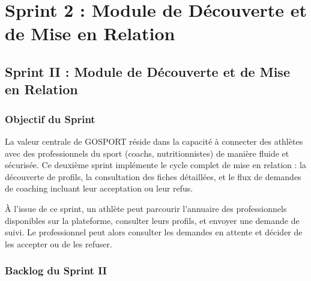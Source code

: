 \chapter{Sprint 2 : Module de Découverte et de Mise en Relation}
\minitoc
\newpage

\section{Sprint II : Module de Découverte et de Mise en Relation}

\subsection{Objectif du Sprint}
La valeur centrale de GOSPORT réside dans la capacité à connecter des athlètes avec des professionnels du sport (coachs, nutritionnistes) de manière fluide et sécurisée. Ce deuxième sprint implémente le cycle complet de mise en relation : la découverte de profils, la consultation des fiches détaillées, et le flux de demandes de coaching incluant leur acceptation ou leur refus.

À l'issue de ce sprint, un athlète peut parcourir l'annuaire des professionnels disponibles sur la plateforme, consulter leurs profils, et envoyer une demande de suivi. Le professionnel peut alors consulter les demandes en attente et décider de les accepter ou de les refuser.

\subsection{Backlog du Sprint II}

\begin{table}[H]
\centering
\renewcommand{\arraystretch}{1.4}
\caption{Backlog du Sprint 2 -- Module de mise en relation}
\end{table}

